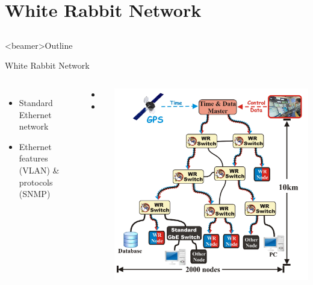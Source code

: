 \documentclass[compress,red]{beamer}
\begin{document}
\section[WR Network]{White Rabbit Network}
\subsection{}
\begin{frame}<beamer>{Outline}
    \tableofcontents [currentsection]
\end{frame}

\begin{frame}{White Rabbit Network}


\begin{columns}[c]
 
  \begin{itemize}
      \item Standard Ethernet network
      \item Ethernet features (VLAN) \& protocols (SNMP)
    \end{itemize}
    \begin{itemize}
      \item \color{Blue}{High accuracy synchronization}
      \item \color{Red}{Reliable and low-latency Control Data}
  \end{itemize}

    \begin{center}
    \includegraphics[height=1.05\textwidth]{network/wr_network-enhanced_pro.pdf}
    \end{center}
\end{columns}

\end{frame}
\end{document}
